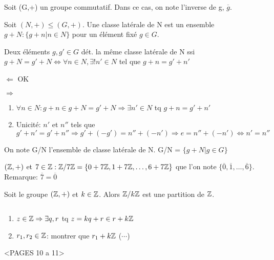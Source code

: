 Soit (G,+) un groupe commutatif. Dans ce cas, on note l'inverse de g, $\overline{g}$.

\begin{defn}
Soit $(N,+) \leq (G,+)$. Une classe latérale de N est un ensemble $g + N : \{ g+n | n \in N \}$ pour un élément fixé $g \in G$.
\end{defn}

\begin{prop}
Deux éléments $g, {g}' \in G$ dét. la même classe latérale de N ssi $g+N = {g}' + N \Leftrightarrow \forall n \in N, \exists! {n}' \in N$ tel que $g+n={g}' + {n}'$
\end{prop}

\begin{demo}
$\Leftarrow$ OK

\hspace{-0.55cm}$\Rightarrow$
	\begin{enumerate}[$\cdot$]
		\item $\forall n \in N: g+n \in g + N = {g}' + N \Rightarrow \exists {n}' \in N$ tq $g+n = {g}' + {n}'$
		\item Unicité: ${n}'$ et ${n}''$ tels que ${g}' + {n}' = {g}' + {n}'' \Rightarrow {g}' + (-{g}') = {n}'' + (-{n}') \Rightarrow e={n}'' + (-{n}') \Leftrightarrow {n}' = {n}''$
	\end{enumerate}
\end{demo}

\begin{defn}
On note G/N l'ensemble de classe latérale de N. G/N = $\{ g + N | g \in G \}$
\end{defn}

\begin{exmp}
$(\mathbb{Z},+)$ et $7 \in \mathbb{Z}: \mathbb{Z}/7\mathbb{Z} = \{ 0+7\mathbb{Z}, 1+7\mathbb{Z}, \ldots, 6+7\mathbb{Z} \}$ que l'on note $\{ \overline{0}, \overline{1},\ldots, \overline{6}\}$. Remarque: $\overline{7} = \overline{0}$
\end{exmp}

\newpage

\begin{prop}
Soit le groupe $(\mathbb{Z},+)$ et $k \in \mathbb{Z}$. Alors $\mathbb{Z}/k\mathbb{Z}$ est une partition de $\mathbb{Z}$.
\end{prop}

\begin{demo} $\;$
\begin{enumerate}[$\cdot$]
	\item $z \in \mathbb{Z} \Rightarrow \exists q,r$ tq $z = kq + r \in r+k\mathbb{Z}$
	\item $r_1,r_2 \in \mathbb{Z}$: montrer que $r_1 + k\mathbb{Z} $ ($\cdots$)
\end{enumerate}
\end{demo}
<PAGES 10 a 11>

